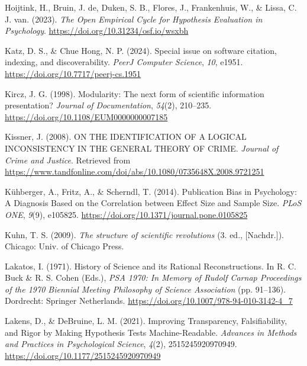 \documentclass[
  man, noextraspace,floatsintext]{apa6}
\newlength{\cslhangindent}
\newenvironment{CSLReferences}[2] %
 {\begin{list}{}{%
  \setlength{\itemindent}{0pt}
  \setlength{\leftmargin}{0pt}
  \setlength{\parsep}{0pt}
  \ifodd #1
   \setlength{\leftmargin}{\cslhangindent}
   \setlength{\itemindent}{-1\cslhangindent}
  \fi
  \setlength{\itemsep}{#2\baselineskip}}}
 {\end{list}}
\begin{document}
\begin{CSLReferences}{1}{0}
Hoijtink, H., Bruin, J. de, Duken, S. B., Flores, J., Frankenhuis, W., \& Lissa, C. J. van. (2023). \emph{The {Open Empirical Cycle} for {Hypothesis Evaluation} in {Psychology}}. \url{https://doi.org/10.31234/osf.io/wsxbh}

Katz, D. S., \& Chue Hong, N. P. (2024). Special issue on software citation, indexing, and discoverability. \emph{PeerJ Computer Science}, \emph{10}, e1951. \url{https://doi.org/10.7717/peerj-cs.1951}

Kircz, J. G. (1998). Modularity: The next form of scientific information presentation? \emph{Journal of Documentation}, \emph{54}(2), 210--235. \url{https://doi.org/10.1108/EUM0000000007185}

Kissner, J. (2008). {ON THE IDENTIFICATION OF A LOGICAL INCONSISTENCY IN THE GENERAL THEORY OF CRIME}. \emph{Journal of Crime and Justice}. Retrieved from \url{https://www.tandfonline.com/doi/abs/10.1080/0735648X.2008.9721251}

Kühberger, A., Fritz, A., \& Scherndl, T. (2014). Publication {Bias} in {Psychology}: {A Diagnosis Based} on the {Correlation} between {Effect Size} and {Sample Size}. \emph{PLoS ONE}, \emph{9}(9), e105825. \url{https://doi.org/10.1371/journal.pone.0105825}

Kuhn, T. S. (2009). \emph{The structure of scientific revolutions} (3. ed., {[}Nachdr.{]}). Chicago: Univ. of Chicago Press.

Lakatos, I. (1971). History of {Science} and its {Rational Reconstructions}. In R. C. Buck \& R. S. Cohen (Eds.), \emph{{PSA} 1970: {In Memory} of {Rudolf Carnap Proceedings} of the 1970 {Biennial Meeting Philosophy} of {Science Association}} (pp. 91--136). Dordrecht: Springer Netherlands. \url{https://doi.org/10.1007/978-94-010-3142-4_7}

Lakens, D., \& DeBruine, L. M. (2021). Improving {Transparency}, {Falsifiability}, and {Rigor} by {Making Hypothesis Tests Machine-Readable}. \emph{Advances in Methods and Practices in Psychological Science}, \emph{4}(2), 2515245920970949. \url{https://doi.org/10.1177/2515245920970949}


\end{CSLReferences}
\end{document}
